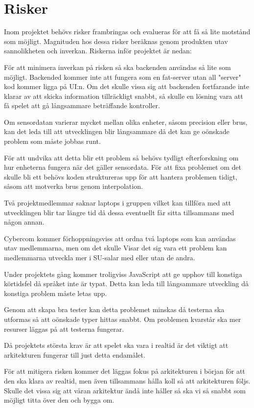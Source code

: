 \section{Risker}
Inom projektet behövs risker frambringas och evalueras för att få så lite motstånd som möjligt. 
Magnituden hos dessa risker beräknas genom produkten utav sannolikheten och inverkan. 
Riskerna inför projektet är nedan:

{
    För att minimera inverkan på risken så ska backenden användas så lite som möjligt.
    Backended kommer inte att fungera som en fat-server utan all "server" kod kommer ligga på UI:n. 
    Om det skulle vissa sig att backenden fortfarande inte klarar av att skicka information tillräckligt snabbt, 
    så skulle en lösning vara att få spelet att gå långsammare beträffande kontroller.
}

{
    Om sensordatan varierar mycket mellan olika enheter, såsom precision eller brus,
    kan det leda till att utvecklingen blir långsammare då det kan ge oönskade problem som måste jobbas runt.

    För att undvika att detta blir ett problem så behövs tydligt efterforskning om hur enheterna fungera när
    det gäller sensordata. För att fixa problemet om det skulle bli ett behövs koden struktureras upp för att
    hantera problemen tidigt, såsom att motverka brus genom interpolation.
}

{
    Två projektmedlemmar saknar laptops i gruppen vilket kan tillföra med att utvecklingen blir tar längre tid
    då dessa eventuellt får sitta tillsammans med någon annan.
    
    Cybercom kommer förhoppningsviss att ordna två laptops som kan användas utav medlemmarna, men om det skulle
    Visar det sig vara ett problem kan medlemmarna utveckla mer i SU-salar med eller utan de andra.
}

{
    Under projektets gång kommer troligviss JavaScript att ge upphov till konstiga körtidsfel då språket inte är typat.
    Detta kan leda till långsammare utveckling då konstiga problem måste letas upp.

    Genom att skapa bra tester kan detta problemet minskas då testerna ska utformas så att oönskade typer hittas snabbt.
    Om problemen kvarstår ska mer resurser läggas på att testerna fungerar.
}

{
    Då projektets största krav är att spelet ska vara i realtid är det viktigt att arkitekturen fungerar till just
    detta endamålet.

    För att mitigera risken kommer det läggas fokus på arkitekturen i början för att den ska klara av realtid, 
    men även tillsammans hålla koll så att arkitekturen följs.
    Skulle det vissa sig att våran arkitektur ändå inte håller så ska vi så snabbt som möjligt titta över den och bygga om.
}

{

}
